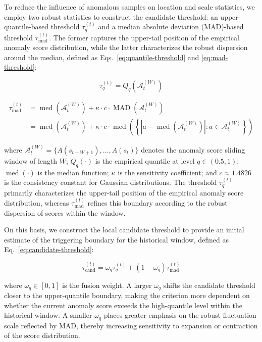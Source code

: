 \documentclass[preprint,12pt]{elsarticle}
\begin{document}
To reduce the influence of anomalous samples on location and scale statistics, we employ two robust statistics to construct the candidate threshold: an upper-quantile-based threshold \(\tau_q^{(t)}\) and a median absolute deviation (MAD)-based threshold \(\tau_{\mathrm{mad}}^{(t)}\). The former captures the upper-tail position of the empirical anomaly score distribution, while the latter characterizes the robust dispersion around the median, defined as Eqs.~\eqref{eq:quantile-threshold} and \eqref{eq:mad-threshold}:

\[\tau_{q}^{(t)}=Q_q(\mathcal{A}_t^{(W)}) \tag{9}\label{eq:quantile-threshold}\]

\[\begin{aligned}
\tau_{\mathrm{mad}}^{(t)} &= \operatorname{med}(\mathcal{A}_t^{(W)})+\kappa \cdot c \cdot \operatorname{MAD}(\mathcal{A}_t^{(W)}) \\
&= \operatorname{med}(\mathcal{A}_t^{(W)})+\kappa \cdot c \cdot\operatorname{med}\left(\left\{\left|a-\operatorname{med}(\mathcal{A}_t^{(W)})\right|:a\in\mathcal{A}_{t}^{(W)}\right\}\right)
\end{aligned} \tag{10}\label{eq:mad-threshold}\]

\noindent where \(\mathcal{A}_t^{(W)}=\{A(s_{t-W+1}),\ldots,A(s_t)\}\) denotes the anomaly score sliding window of length \(W\); \(Q_q(\cdot)\) is the empirical quantile at level \(q\in(0.5,1)\); \(\operatorname{med}(\cdot)\) is the median function; \(\kappa\) is the sensitivity coefficient; and \(c \approx 1.4826\) is the consistency constant for Gaussian distributions. The threshold \(\tau_q^{(t)}\) primarily characterizes the upper-tail position of the empirical anomaly score distribution, whereas \(\tau_{\mathrm{mad}}^{(t)}\) refines this boundary according to the robust dispersion of scores within the window.

On this basis, we construct the local candidate threshold to provide an initial estimate of the triggering boundary for the historical window, defined as Eq.~\eqref{eq:candidate-threshold}:

\[\tau_{\mathrm{cand}}^{(t)}=\omega_q\tau_q^{(t)}+(1-\omega_q)\tau_{\mathrm{mad}}^{(t)} \tag{11}\label{eq:candidate-threshold}\]

\noindent where \(\omega_q \in [0,1]\) is the fusion weight. A larger \(\omega_q\) shifts the candidate threshold closer to the upper-quantile boundary, making the criterion more dependent on whether the current anomaly score exceeds the high-quantile level within the historical window. A smaller \(\omega_q\) places greater emphasis on the robust fluctuation scale reflected by MAD, thereby increasing sensitivity to expansion or contraction of the score distribution.
\end{document}
